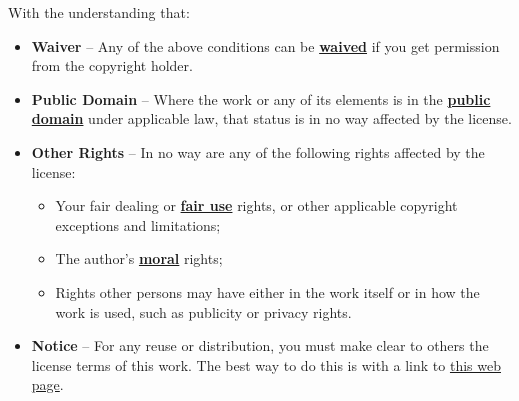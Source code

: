{  \noindent With the understanding that:
  \begin{itemize}
    \item \textbf{Waiver} --  Any of the above conditions can be
      \underline{\textbf{waived}} if you get permission from the copyright holder.
    \item \textbf{Public Domain} --  Where the work or any of its elements is in the 
      \underline{\textbf{public domain}} under applicable law, that status is in
      no way affected by the license.
    \item \textbf{Other Rights} -- In no way are any of the following rights
      affected by the license:  
      \begin{itemize}
        \item Your fair dealing or  \underline{\textbf{fair use}} rights, or other
          applicable copyright exceptions and limitations;
        \item The author's \underline{\textbf{moral}} rights;
        \item Rights other persons may have either in the work itself or in how
          the work is used, such as publicity or privacy rights. 
      \end{itemize}
    \item \textbf{Notice} --  For any reuse or distribution, you must make clear to
      others the license terms of this work. The best way to do this is with a
      link to
      \href{http://creativecommons.org/licenses/by-nc-sa/2.0/fr/deed.en_US}{this web page}.  
  \end{itemize}
}



%
